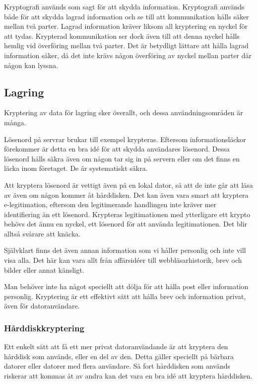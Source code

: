 \documentclass{article}
\begin{document}
Kryptografi används som sagt för att skydda information. Kryptografi används både för att skydda lagrad information och se till att kommunikation hålls säker mellan två parter. Lagrad information kräver liksom all kryptering en nyckel för att tydas. Krypterad kommunikation ser dock även till att denna nyckel hålls hemlig vid överföring mellan två parter. Det är betydligt lättare att hålla lagrad information säker, då det inte krävs någon överföring av nyckel mellan parter där någon kan lyssna.

	\subsection {Lagring}

	Kryptering av data för lagring sker överallt, och dessa användningsområden är många.

	Lösenord på servrar brukar till exempel krypteras. Eftersom informationsläckor förekommer är detta en bra idé för att skydda användares lösenord. Dessa lösenord hålls säkra även om någon tar sig in på servern eller om det finns en läcka inom företaget. De är systematiskt säkra.

	Att kryptera lösenord är vettigt även på en lokal dator, så att de inte går att läsa av även om någon kommer åt hårddisken. Det kan även vara smart att kryptera e-legitimation, eftersom den legitimerande handlingen inte kräver mer identifiering än ett lösenord. Krypteras legitimationen med ytterligare ett krypto behövs det ännu en nyckel, ett lösenord för att använda legitimationen. Det blir alltså svårare att knäcka.

	Självklart finns det även annan information som vi håller personlig och inte vill visa alla. Det här kan vara allt från affärsidéer till webbläsarhistorik, brev och bilder eller annat känsligt.

	Man behöver inte ha något speciellt att dölja för att hålla post eller information personlig. Kryptering är ett effektivt sätt att hålla brev och information privat, även för datoranvändare.

		\subsubsection {Hårddiskkryptering}

		Ett enkelt sätt att få ett mer privat datoranvändande är att kryptera den hårddisk som används, eller en del av den. Detta gäller speciellt på bärbara datorer eller datorer med flera användare. Så fort hårddisken som används riskerar att kommas åt av andra kan det vara en bra idé att kryptera hårddisken.
\end{document}
